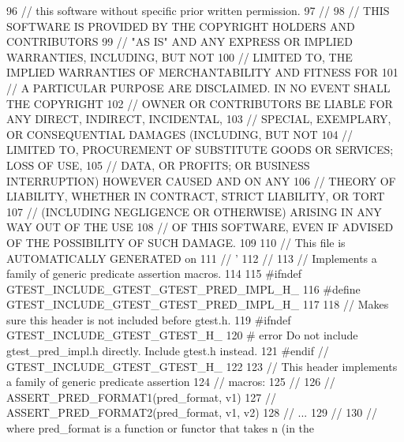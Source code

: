 \begin{DoxyCode}
{{{96 \textcolor{stringliteral}{// this software without specific prior written permission.}
97 \textcolor{stringliteral}{//}
98 \textcolor{stringliteral}{// THIS SOFTWARE IS PROVIDED BY THE COPYRIGHT HOLDERS AND CONTRIBUTORS}
99 \textcolor{stringliteral}{// "AS IS" AND ANY EXPRESS OR IMPLIED WARRANTIES, INCLUDING, BUT NOT}
100 \textcolor{stringliteral}{// LIMITED TO, THE IMPLIED WARRANTIES OF MERCHANTABILITY AND FITNESS FOR}
101 \textcolor{stringliteral}{// A PARTICULAR PURPOSE ARE DISCLAIMED. IN NO EVENT SHALL THE COPYRIGHT}
102 \textcolor{stringliteral}{// OWNER OR CONTRIBUTORS BE LIABLE FOR ANY DIRECT, INDIRECT, INCIDENTAL,}
103 \textcolor{stringliteral}{// SPECIAL, EXEMPLARY, OR CONSEQUENTIAL DAMAGES (INCLUDING, BUT NOT}
104 \textcolor{stringliteral}{// LIMITED TO, PROCUREMENT OF SUBSTITUTE GOODS OR SERVICES; LOSS OF USE,}
105 \textcolor{stringliteral}{// DATA, OR PROFITS; OR BUSINESS INTERRUPTION) HOWEVER CAUSED AND ON ANY}
106 \textcolor{stringliteral}{// THEORY OF LIABILITY, WHETHER IN CONTRACT, STRICT LIABILITY, OR TORT}
107 \textcolor{stringliteral}{// (INCLUDING NEGLIGENCE OR OTHERWISE) ARISING IN ANY WAY OUT OF THE USE}
108 \textcolor{stringliteral}{// OF THIS SOFTWARE, EVEN IF ADVISED OF THE POSSIBILITY OF SUCH DAMAGE.}
109 \textcolor{stringliteral}{}
110 \textcolor{stringliteral}{// This file is AUTOMATICALLY GENERATED on %
111 \textcolor{stringliteral}{// '%
112 \textcolor{stringliteral}{//}
113 \textcolor{stringliteral}{// Implements a family of generic predicate assertion macros.}
114 \textcolor{stringliteral}{}
115 \textcolor{stringliteral}{#ifndef GTEST\_INCLUDE\_GTEST\_GTEST\_PRED\_IMPL\_H\_}
116 \textcolor{stringliteral}{#define GTEST\_INCLUDE\_GTEST\_GTEST\_PRED\_IMPL\_H\_}
117 \textcolor{stringliteral}{}
118 \textcolor{stringliteral}{// Makes sure this header is not included before gtest.h.}
119 \textcolor{stringliteral}{#ifndef GTEST\_INCLUDE\_GTEST\_GTEST\_H\_}
120 \textcolor{stringliteral}{# error Do not include gtest\_pred\_impl.h directly.  Include gtest.h instead.}
121 \textcolor{stringliteral}{#endif  // GTEST\_INCLUDE\_GTEST\_GTEST\_H\_}
122 \textcolor{stringliteral}{}
123 \textcolor{stringliteral}{// This header implements a family of generic predicate assertion}
124 \textcolor{stringliteral}{// macros:}
125 \textcolor{stringliteral}{//}
126 \textcolor{stringliteral}{//   ASSERT\_PRED\_FORMAT1(pred\_format, v1)}
127 \textcolor{stringliteral}{//   ASSERT\_PRED\_FORMAT2(pred\_format, v1, v2)}
128 \textcolor{stringliteral}{//   ...}
129 \textcolor{stringliteral}{//}
130 \textcolor{stringliteral}{// where pred\_format is a function or functor that takes n (in the}
}}}}}
\end{DoxyCode}
